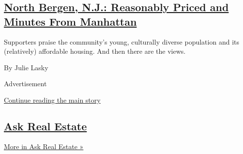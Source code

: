 \begin{enumerate}
  \hypertarget{north-bergen-nj-reasonably-priced-and-minutes-from-manhattan}{%
  \subsection{\texorpdfstring{\href{/2020/07/29/realestate/north-bergen-nj-reasonably-priced-and-minutes-from-manhattan.html}{North
  Bergen, N.J.: Reasonably Priced and Minutes From
  Manhattan}}{North Bergen, N.J.: Reasonably Priced and Minutes From Manhattan}}\label{north-bergen-nj-reasonably-priced-and-minutes-from-manhattan}}

  Supporters praise the community's young, culturally diverse population
  and its (relatively) affordable housing. And then there are the views.

  By Julie Lasky
\end{enumerate}

Advertisement

\protect\hyperlink{after-mid1}{Continue reading the main story}

\hypertarget{ask-real-estate-1}{%
\subsection{\texorpdfstring{\href{/column/ask-real-estate}{Ask Real
Estate}}{Ask Real Estate}}\label{ask-real-estate-1}}

\href{/column/ask-real-estate}{More in Ask Real Estate »}

